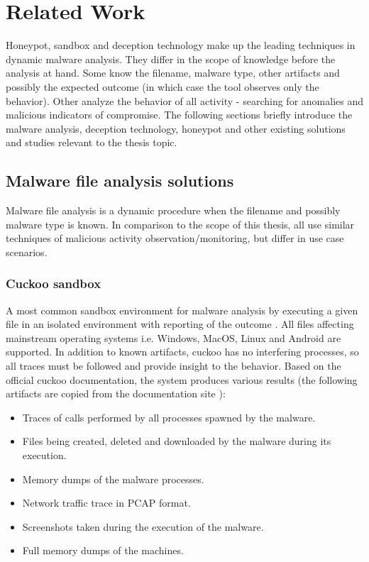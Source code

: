 \chapter{Related Work \label{related}}
Honeypot, sandbox and deception technology make up the leading techniques in dynamic malware analysis. They differ in the scope of knowledge before the analysis at hand. Some know the filename, malware type, other artifacts and possibly the expected outcome (in which case the tool observes only the behavior). Other analyze the behavior of all activity - searching for anomalies and malicious indicators of compromise. The following sections briefly introduce the malware analysis, deception technology, honeypot and other existing solutions and studies relevant to the thesis topic.

\section{Malware file analysis solutions \label{related:malware-anal}}
Malware file analysis is a dynamic procedure when the filename and possibly malware type is known. In comparison to the scope of this thesis, all use similar techniques of malicious activity observation/monitoring, but differ in use case scenarios.

\subsection{Cuckoo sandbox \label{related:malware-anal:cuckoo}}
A most common sandbox environment for malware analysis by executing a given file in an isolated environment with reporting of the outcome \cite{docs:cuckoo:what}. All files affecting mainstream operating systems i.e. Windows, MacOS, Linux and Android are supported. In addition to known artifacts, cuckoo has no interfering processes, so all traces must be followed and provide insight to the behavior. Based on the official cuckoo documentation, the system produces various results (the following artifacts are copied from the documentation site \cite{docs:cuckoo:what}):

\begin{itemize}[noitemsep]
	\item
	Traces of calls performed by all processes spawned by the malware.
	\item
	Files being created, deleted and downloaded by the malware during its execution.
	\item
	Memory dumps of the malware processes.
	\item
	Network traffic trace in PCAP format.
	\item
	Screenshots taken during the execution of the malware.
	\item
	Full memory dumps of the machines.
\end{itemize}

